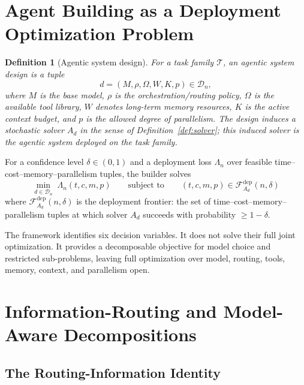 \documentclass[10pt]{article}
\theoremstyle{paperplain}
\theoremstyle{paperdefinition}
\newtheorem{definition}[theorem]{Definition}
\theoremstyle{paperremark}
\newcommand{\cD}{\mathcal{D}}
\newcommand{\cT}{\mathcal{T}}
\newcommand{\cF}{\mathcal{F}}
\begin{document}
\section{Agent Building as a Deployment Optimization Problem}
\label{sec:design}

\begin{definition}[Agentic system design]
\label{def:agentic-system-design}
For a task family $\cT$, an \emph{agentic system design} is a tuple
\begin{equation}
\label{eq:design-tuple}
d = (M, \rho, \Omega, W, K, p) \in \cD_n,
\end{equation}
where $M$ is the base model, $\rho$ is the orchestration/routing policy, $\Omega$ is the available tool library, $W$ denotes long-term memory resources, $K$ is the active context budget, and $p$ is the allowed degree of parallelism.
The design induces a stochastic solver $A_d$ in the sense of Definition~\ref{def:solver}; this induced solver is the agentic system deployed on the task family.
\end{definition}

For a confidence level $\delta \in (0,1)$ and a deployment loss $\Lambda_n$ over feasible time--cost--memory--parallelism tuples, the builder solves
\begin{equation}
\label{eq:master-design}
\boxed{\;
\min_{d \in \cD_n}\; \Lambda_n(t,c,m,p)
\qquad\text{subject to}\qquad
(t,c,m,p) \in \cF^{\mathrm{dep}}_{A_d}(n,\delta)
\;}
\end{equation}
where $\cF^{\mathrm{dep}}_{A_d}(n,\delta)$ is the deployment frontier: the set of time--cost--memory--parallelism tuples at which solver $A_d$ succeeds with probability $\ge 1-\delta$.

The framework identifies six decision variables. It does not solve their full joint optimization. It provides a decomposable objective for model choice and restricted sub-problems, leaving full optimization over model, routing, tools, memory, context, and parallelism open.

\section{Information-Routing and Model-Aware Decompositions}
\label{sec:decomposition}

\subsection{The Routing-Information Identity}
\label{subsec:ri-identity}
\end{document}

